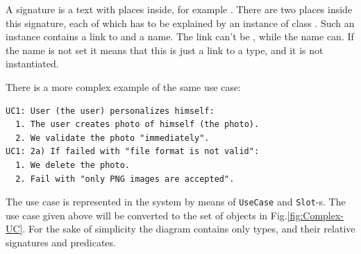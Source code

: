 \documentclass[12pt,oneside,letterpaper]{article}
\begin{document}
        A signature is a text with places inside, for example
        . There are two places inside
        this signature, each of which has to be explained by an
        instance of class . Such an instance contains
        a link to  and a name. The link can't be ,
        while the name can. If the name is not set it means that this is just
        a link to a type, and it is not instantiated.

        There is a more complex example of the same use case:

\begin{lstlisting}
UC1: User (the user) personalizes himself:
  1. The user creates photo of himself (the photo).
  2. We validate the photo "immediately".
UC1: 2a) If failed with "file format is not valid":
  1. We delete the photo.
  2. Fail with "only PNG images are accepted".
\end{lstlisting}

        The use case is represented in the system by means of
        \texttt{UseCase} and \texttt{Slot}-s. The
        use case given above will be converted to the set
        of objects in Fig.\ref{fig:Complex-UC}. For the sake of
        simplicity the diagram contains only  types, and
        their relative signatures and predicates.
\end{document}
